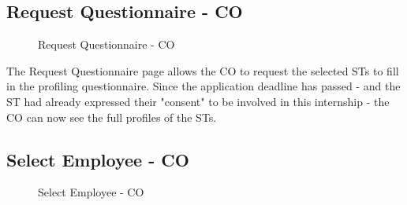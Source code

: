 \subsection{Request Questionnaire - CO}
\label{subsec:request-questionnaire-co}%

\begin{figure}[H]
    \centering
    \caption{Request Questionnaire - CO}
    \label{fig:request-questionnaire-co}
\end{figure}

\par The Request Questionnaire page allows the CO to request the selected STs to fill in the profiling questionnaire.
Since the application deadline has passed - and the ST had already expressed their "consent" to be involved in this
internship - the CO can now see the full profiles of the STs.

\subsection{Select Employee - CO}
\label{subsec:select-employee-co}%

\begin{figure}[H]
    \centering
    \caption{Select Employee - CO}
    \label{fig:select-employee-co}
\end{figure}

